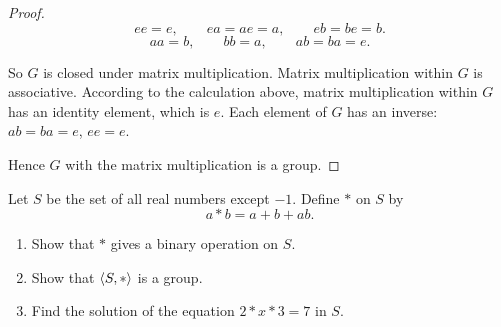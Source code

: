 \begin{proof}
    \[
        ee = e,\qquad ea = ae = a,\qquad eb = be = b.
    \]
    \[
        aa = b,\qquad bb = a,\qquad ab = ba = e.
    \]

    So $G$ is closed under matrix multiplication. Matrix multiplication within $G$ is associative. According to the calculation above, matrix multiplication within $G$ has an identity element, which is $e$. Each element of $G$ has an inverse: $ab = ba = e$, $ee = e$.

    Hence $G$ with the matrix multiplication is a group.
\end{proof}

\newpage
\begin{exercise}
    Let $S$ be the set of all real numbers except $-1$. Define $*$ on $S$ by
    \[
        a * b = a + b + ab.
    \]
    \begin{enumerate}[label={\textbf{\alph*.}}]
        \item Show that $*$ gives a binary operation on $S$.
        \item Show that $\left\langle{S, *}\right\rangle$ is a group.
        \item Find the solution of the equation $2 * x * 3 = 7$ in $S$.
    \end{enumerate}
\end{exercise}

